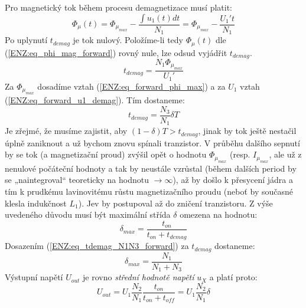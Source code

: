       Pro magnetický tok během procesu demagnetizace musí platit:
      \begin{equation}\label{ENZ:eq_phi_mag_forward}
       \Phi_\mu(t) = \Phi_{\mu_{max}} - \frac{\int{u_1(t)dt}}{N_1} = \Phi_{\mu_{max}} -
       \frac{U_1't}{N_1}
      \end{equation}
      Po uplynutí $t_{demag}$ je tok nulový. Položíme-li tedy $\Phi_\mu(t)$ dle
      (\ref{ENZ:eq_phi_mag_forward}) rovný nule, lze odsud vyjádřit $t_{demag}$.
      \begin{equation}\label{ENZ:eq_tdemag_forward}
       t_{demag} = \frac{N_1\Phi_{\mu_{max}}}{U_1'}
      \end{equation}
      Za $\Phi_{\mu_{max}}$ dosadíme vztah (\ref{ENZ:eq_forward_phi_max}) a za $U_1$  vztah
      (\ref{ENZ:eq_forward_u1_demag}). Tím dostaneme:
      \begin{equation}\label{ENZ:eq_tdemag_N1N3_forward}
       t_{demag} = \frac{N_3}{N_1}\delta T
      \end{equation}
      Je zřejmé, že musíme zajistit, aby $(1-\delta)T > t_{demag}$, jinak by tok ještě nestačil
      úplně zaniknout a už bychom znovu spínali tranzistor. V průběhu dalšího sepnutí by se tok (a
      magnetizační proud) zvýšil opět o hodnotu $\Phi_{\mu_{max}}$ (resp.  $I_{\mu_{max}}$, ale už z
      nenulové počáteční hodnoty a tak by neustále vzrůstal (během dalších period by se
      „naintegroval“ teoreticky na hodnotu $\rightarrow\infty$), až by došlo k přesycení jádra a tím
      k prudkému lavinovitému růstu magnetizačního proudu (neboť by současné klesla indukčnost
      $L_1$). Jev by postupoval až do zničení tranzistoru. Z výše uvedeného důvodu musí být
      maximální střída $\delta$ omezena na hodnotu:
      \begin{equation}\label{ENZ:eq_forward_delta_max}
      \delta_{max} = \frac{t_{on}}{t_{on}+t_{demag}}
      \end{equation}
      Dosazením (\ref{ENZ:eq_tdemag_N1N3_forward}) za $t_{demag}$ dostaneme:
      \begin{equation}\label{ENZ:eq_forward_delta_max1}
      \delta_{max} = \frac{N_1}{N_1+N_3}
      \end{equation}
      Výstupní napětí $U_{out}$ je rovno \emph{střední hodnotě napětí} $u_X$ a platí proto:
      \begin{equation}\label{ENZ:eq_uout_forward_delta}
      U_{out} = U_1\frac{N_2}{N_1}\frac{t_{on}}{t_{on} + t_{off}} = U_1\frac{N_2}{N_1}\delta
      \end{equation}
      
